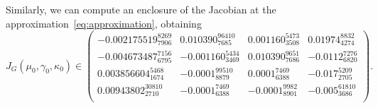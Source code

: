 \documentclass[11pt]{article}
\begin{document}
Similarly, we can compute an enclosure of the Jacobian at the
approximation~\eqref{eq:approximation}, obtaining
\begin{equation*}
  J_{G}(\mu_0, \gamma_0, \kappa_0) \in
  \begin{pmatrix}
    -0.002175519_{7906}^{8269} & 0.010390_{7685}^{96410} & 0.001160_{3508}^{5473} & 0.01974_{4274}^{8832} \\
    -0.004673487_{6795}^{7156} & -0.001160_{3469}^{5434} & 0.010390_{7686}^{9651} & -0.0112_{6820}^{7276} \\
    0.003856604_{1674}^{5468} & -0.0001_{8879}^{99510} & 0.0001_{6388}^{7469} & -0.017_{2705}^{5209} \\
    0.00943802_{2710}^{30810} & -0.0001_{6388}^{7469} & -0.0001_{8901}^{9982} & -0.005_{3686}^{61810} \\
  \end{pmatrix}.
\end{equation*}
\end{document}
